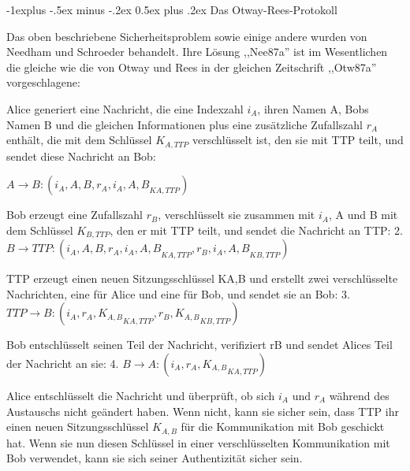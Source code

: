 \documentclass[a4paper]{article}
\makeatletter
\renewcommand{\subsection}{\@startsection{subsection}{2}{0mm}%
 {-1explus -.5ex minus -.2ex}%
 {0.5ex plus .2ex}%
 {\normalfont\normalsize\bfseries}}
\makeatother
\begin{document}
\begin{multicols}{3}
      \subsection{Das Otway-Rees-Protokoll}
      \begin{itemize*}
            \item Das oben beschriebene Sicherheitsproblem sowie einige andere wurden
            von Needham und Schroeder behandelt. Ihre Lösung ,,Nee87a'' ist im
            Wesentlichen die gleiche wie die von Otway und Rees in der gleichen
            Zeitschrift ,,Otw87a'' vorgeschlagene:
            \begin{itemize*}
                  \item Alice generiert eine Nachricht, die eine Indexzahl $i_A$, ihren Namen A, Bobs Namen B und die gleichen Informationen plus eine zusätzliche Zufallszahl $r_A$ enthält, die mit dem Schlüssel $K_{A,TTP}$ verschlüsselt ist, den sie mit TTP teilt, und sendet diese Nachricht an Bob:
                  \begin{enumerate*}
                        \item $A\rightarrow B:(i_A, A, B,{r_A, i_A, A, B}_{{K}{A,TTP}})$
                  \end{enumerate*}
                  \item Bob erzeugt eine Zufallszahl $r_B$, verschlüsselt sie zusammen mit $i_A$, A und B mit dem Schlüssel $K_{B,TTP}$, den er mit TTP teilt, und sendet die Nachricht an TTP: 2. $B\rightarrow TTP:(i_A, A, B,{r_A,i_A,A,B}_{{K}{A,TTP}},{r_B,i_A,A,B}_{{K}{B,TTP}})$
                  \item TTP erzeugt einen neuen Sitzungsschlüssel KA,B und erstellt zwei verschlüsselte Nachrichten, eine für Alice und eine für Bob, und sendet sie an Bob: 3. $TTP\rightarrow B:(i_A,{r_A,K_{A,B}}_{{K}{A,TTP}},{r_B, K_{A,B}}_{{K}{B,TTP}})$
                  \item Bob entschlüsselt seinen Teil der Nachricht, verifiziert rB und sendet Alices Teil der Nachricht an sie: 4. $B\rightarrow A:(i_A,{r_A,K_{A,B}}_{{K}{A,TTP}})$
                  \item Alice entschlüsselt die Nachricht und überprüft, ob sich $i_A$ und $r_A$ während des Austauschs nicht geändert haben. Wenn nicht, kann sie sicher sein, dass TTP ihr einen neuen Sitzungsschlüssel $K_{A,B}$ für die Kommunikation mit Bob geschickt hat. Wenn sie nun diesen Schlüssel in einer verschlüsselten Kommunikation mit Bob verwendet, kann sie sich seiner Authentizität sicher sein.
            \end{itemize*}

\end{itemize*}
\end{multicols}
\end{document}

